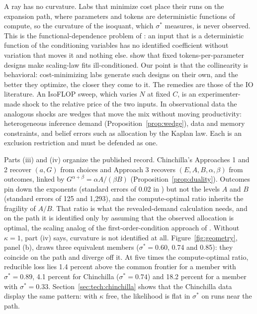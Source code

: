 A ray has no curvature. Labs that minimize cost place their runs on the expansion path, where parameters and tokens are
deterministic functions of compute, so the curvature of the isoquant, which $\sigma^*$ measures, is never observed. This
is the functional-dependence problem of \citet{ackerberg2015identification}: an input that is a deterministic function
of the conditioning variables has no identified coefficient without variation that moves it and nothing else.
\citet{kricheli2026tokens} show that fixed tokens-per-parameter designs make scaling-law fits ill-conditioned. Our
point is that the collinearity is behavioral: cost-minimizing labs generate such designs on their own, and the better
they optimize, the closer they come to it. The remedies are those of the IO literature. An IsoFLOP sweep, which varies
$N$ at fixed $C$, is an experimenter-made shock to the relative price of the two inputs. In observational data the
analogous shocks are wedges that move the mix without moving productivity: heterogeneous inference demand
(Proposition~\ref{prop:wedge}), data and memory constraints, and belief errors such as allocation by the Kaplan law.
Each is an exclusion restriction and must be defended as one.

Parts (iii) and (iv) organize the published record. Chinchilla's Approaches 1 and 2 recover $(a,G)$ from choices and
Approach 3 recovers $(E,A,B,\alpha,\beta)$ from outcomes, linked by $G^{\alpha+\beta}=\alpha A/(\beta B)$
(Proposition~\ref{prop:duality}). Outcomes pin down the exponents (standard
errors of 0.02 in \citealp{besiroglu2024chinchilla}) but not the levels $A$ and $B$ (standard errors of 125 and 1,293),
and the compute-optimal ratio inherits the fragility of $A/B$. That ratio is what the revealed-demand calculation needs,
and on the path it is identified only by assuming that the observed allocation is optimal, the scaling analog of the
first-order-condition approach of \citet{gandhi2020identification}. Without $\kappa=1$, part (iv) says, curvature is not
identified at all. Figure~\ref{fig:geometry}, panel (b), draws three equivalent members ($\sigma^*=0.60$, 0.74 and
0.85): they coincide on the path and diverge off it. At five times the compute-optimal ratio, reducible loss lies
1.4 percent above the common frontier for a member with $\sigma^*=0.89$, 4.1 percent for Chinchilla ($\sigma^*=0.74$)
and 18.2 percent for a member with $\sigma^*=0.33$. Section~\ref{sec:tech:chinchilla} shows that the Chinchilla data
display the same pattern: with $\kappa$ free, the likelihood is flat in $\sigma^*$ on runs near the path.

